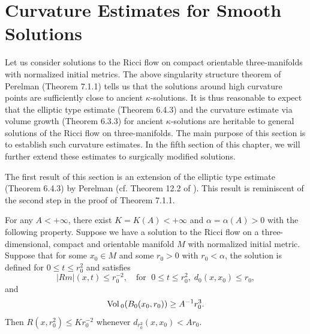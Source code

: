 \section{Curvature Estimates for Smooth Solutions}

Let us consider solutions to the Ricci flow on compact orientable
three-manifolds with normalized initial metrics. The above
singularity structure theorem of Perelman (Theorem 7.1.1) tells us
that the solutions around high curvature points are sufficiently
close to ancient $\kappa$-solutions. It is thus reasonable to
expect that the elliptic type estimate (Theorem 6.4.3) and the
curvature estimate via volume growth (Theorem 6.3.3) for ancient
$\kappa$-solutions are heritable to general solutions of the Ricci
flow on three-manifolds. The main purpose of this section is to
establish such curvature estimates. In the fifth section of this
chapter, we will further extend these estimates to surgically
modified solutions.

The first result of this section is an extension of the elliptic
type estimate (Theorem 6.4.3) by Perelman (cf. Theorem 12.2 of
\cite{P1}). This result is reminiscent of the second step in the
proof of Theorem 7.1.1.

\begin{theorem}
  \label{thm:cz-almost-euclidean-volume-curvature-control}

For any $A<+\infty$, there exist $K=K(A)<+\infty$ and
$\alpha=\alpha(A)>0$ with the following property. Suppose we have
a solution to the Ricci flow on a three-dimensional, compact and
orientable manifold $M$ with normalized initial metric. Suppose
that for some $x_0\in M$ and some $r_0>0$ with $r_0<\alpha$, the
solution is defined for $0\le t\le r_0^2$ and satisfies
$$
|Rm|(x,t)\le r_0^{-2},\quad \text{for }\; 0\le t\le
r_0^2,\;d_0(x,x_0)\le r_0,
$$
and
$$
{\rm Vol}\,_0(B_0(x_0,r_0))\ge A^{-1}r_0^3.
$$
Then $R(x,r_0^2)\le Kr_0^{-2}$ whenever $d_{r_0^2}(x,x_0)<Ar_0$.
\end{theorem}

